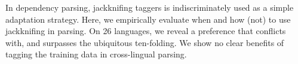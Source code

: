 In dependency parsing, jackknifing taggers is indiscriminately used as a simple adaptation strategy. Here, we empirically evaluate when and how (not) to use jackknifing in parsing. On 26 languages, we reveal a preference that conflicts with, and surpasses the ubiquitous ten-folding. We show no clear benefits of tagging the training data in cross-lingual parsing.
